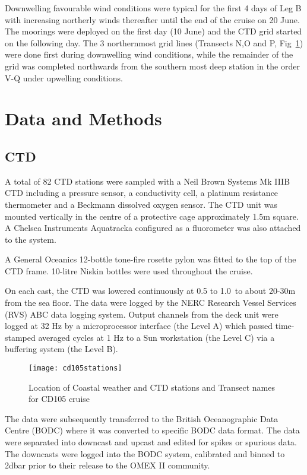 Downwelling favourable wind conditions were typical for the first
4 days of Leg B with increasing northerly winds thereafter until
the end of the cruise on 20 June. The moorings were deployed on
the first day (10 June) and the CTD grid started on the following
day. The 3 northernmost grid lines (Transects N,O and P,
Fig~\ref{fig:cd105stations}) were done first during downwelling
wind conditions, while the remainder of the grid was completed
northwards from the southern most deep station in the order V-Q
under upwelling conditions.
\section{Data and Methods}
\subsection{CTD}
A total of 82 CTD stations were sampled with a Neil Brown Systems
Mk IIIB CTD including a pressure sensor, a conductivity cell, a
platinum resistance thermometer and a Beckmann dissolved oxygen
sensor. The CTD unit was mounted vertically in the centre of a
protective cage approximately 1.5m square. A Chelsea Instruments
Aquatracka configured as a fluorometer was also attached to the
system.

A General Oceanics 12-bottle tone-fire rosette pylon was fitted to
the top of the CTD frame. 10-litre Niskin bottles were used
throughout the cruise.

On each cast, the CTD was lowered continuously at 0.5 to 1.0\vel\,
to about 20-30m from the sea floor. The data were logged by the
NERC Research Vessel Services (RVS) ABC data logging system.
Output channels from the deck unit were logged at 32 Hz by a
microprocessor interface (the Level A) which passed time-stamped
averaged cycles at 1 Hz to a Sun workstation (the Level C) via a
buffering system (the Level B).
\begin{figure} \centering
\texttt{[image: cd105stations]}
\caption{Location of Coastal weather and CTD stations and Transect
names for CD105 cruise} \label{fig:cd105stations}
\end{figure}

The data were subsequently transferred to the British
Oceanographic Data Centre (BODC) where it was converted to
specific BODC data format. The data were separated into downcast
and upcast and edited for spikes or spurious data. The downcasts
were logged into the BODC system, calibrated and binned to 2dbar
prior to their release to the OMEX II community.

